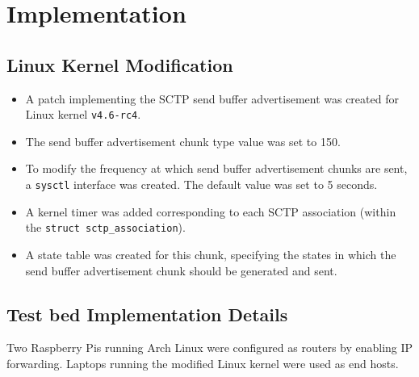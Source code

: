 \chapter{Implementation}

\section{Linux Kernel Modification}
\begin{itemize}
  \item A patch implementing the SCTP send buffer advertisement was created for
    Linux kernel \texttt{v4.6-rc4}.
  \item The send buffer advertisement chunk type value was set to 150.
  \item To modify the frequency at which send buffer advertisement chunks are
    sent, a \texttt{sysctl} interface was created. The default value was set to
    5 seconds.
  \item A kernel timer was added corresponding to each SCTP association
    (within the \texttt{struct sctp\_association}).
  \item A state table was created for this chunk, specifying the states in which
    the send buffer advertisement chunk should be generated and sent.
\end{itemize}

\section{Test bed Implementation Details}
Two Raspberry Pis running Arch Linux were configured as routers by enabling
IP forwarding.
Laptops running the modified Linux kernel were used as end hosts.

